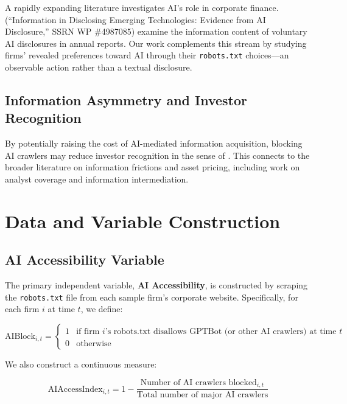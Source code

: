 \documentclass[12pt,a4paper]{article}
\begin{document}
A rapidly expanding literature investigates AI's role in corporate finance. \citet{CaoYangZhao2024} (``Information in Disclosing Emerging Technologies: Evidence from AI Disclosure,'' SSRN WP \#4987085) examine the information content of voluntary AI disclosures in annual reports. Our work complements this stream by studying firms' revealed preferences toward AI through their \texttt{robots.txt} choices---an observable action rather than a textual disclosure.

\subsection{Information Asymmetry and Investor Recognition}

By potentially raising the cost of AI-mediated information acquisition, blocking AI crawlers may reduce investor recognition in the sense of \citet{Merton1987}. This connects to the broader literature on information frictions and asset pricing, including work on analyst coverage and information intermediation.

\section{Data and Variable Construction}

\subsection{AI Accessibility Variable}

The primary independent variable, \textbf{AI Accessibility}, is constructed by scraping the \texttt{robots.txt} file from each sample firm's corporate website. Specifically, for each firm $i$ at time $t$, we define:

\begin{equation}
\text{AIBlock}_{i,t} = \begin{cases} 1 & \text{if firm } i \text{'s robots.txt disallows GPTBot (or other AI crawlers) at time } t \\ 0 & \text{otherwise} \end{cases}
\end{equation}

We also construct a continuous measure:

\begin{equation}
\text{AIAccessIndex}_{i,t} = 1 - \frac{\text{Number of AI crawlers blocked}_{i,t}}{\text{Total number of major AI crawlers}}
\end{equation}
\end{document}
